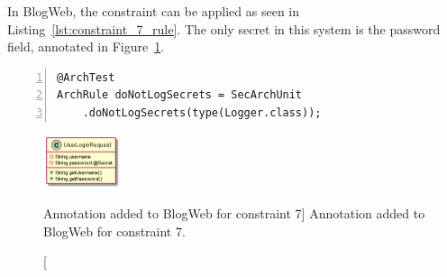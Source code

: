 In BlogWeb, the constraint can be applied as seen in Listing~\ref{lst:constraint_7_rule}. The only secret in this system is the password field, annotated in Figure~\ref{fig:secrets_toy_system}.

\begin{minipage}{\linewidth}
\begin{lstlisting}[caption={Application of constraint 7 to BlogWeb.}, captionpos=b, label=lst:constraint_7_rule, numbers=left]
@ArchTest
ArchRule doNotLogSecrets = SecArchUnit
    .doNotLogSecrets(type(Logger.class));
\end{lstlisting}
\end{minipage}

\begin{figure}
    \centering
    \includegraphics[width=0.2\textwidth]{figure/toyexamples/Secrets.png}
    \caption
        [Annotation added to BlogWeb for constraint 7]
        {Annotation added to BlogWeb for constraint 7.}
    \label{fig:secrets_toy_system}
\end{figure}